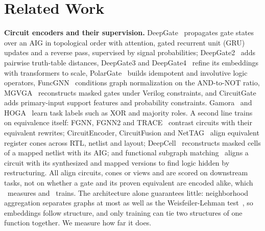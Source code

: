 \section{Related Work}\label{sec:related}
\noindent\textbf{Circuit encoders and their supervision.} DeepGate~\cite{DBLP:conf/dac/0019KSWY022} propagates gate states over an
AIG in topological order with attention, gated recurrent unit (GRU)~\cite{DBLP:conf/emnlp/ChoMGBBSB14} updates and a reverse pass, supervised by signal
probabilities; DeepGate2~\cite{DBLP:conf/iccad/ShiPKLLHZYCX23} adds pairwise truth-table distances, DeepGate3 and DeepGate4~\cite{DBLP:conf/iccad/ShiZKZ0024,DBLP:conf/iclr/ZhengHZSDX025}
refine its embeddings with transformers to scale, PolarGate~\cite{DBLP:conf/iccad/0006ZZLY024} builds idempotent and involutive logic
operators, FuncGNN~\cite{DBLP:journals/trets/ZhaoGZWLJ26} conditions graph normalization on the AND-to-NOT ratio, MGVGA~\cite{DBLP:conf/iclr/WuZ0025} reconstructs masked gates under Verilog constraints, and CircuitGate~\cite{DBLP:journals/corr/abs-2610-09549} adds
primary-input support features and probability constraints. Gamora~\cite{DBLP:conf/dac/WuLHDYX23} and
HOGA~\cite{DBLP:conf/dac/DengYYSCJZ24} learn task labels such as XOR and majority roles. A second line trains on equivalence itself:
FGNN, FGNN2 and TRACE~\cite{DBLP:conf/dac/WangBHZXHYH22,DBLP:journals/tcad/WangBHZXHHY25,DBLP:conf/dac/ZhengZZX26} contrast circuits with their equivalent rewrites;
CircuitEncoder, CircuitFusion and NetTAG~\cite{DBLP:conf/aspdac/FangLZX25,DBLP:conf/iclr/FangLWX25,DBLP:conf/dac/FangLLLZX25} align equivalent register
cones across RTL, netlist and layout; DeepCell~\cite{DBLP:conf/iccad/ShiMZZPJYYCX25} reconstructs masked cells of a mapped netlist with
its AIG; and functional subgraph matching~\cite{DBLP:conf/nips/ZhengLSX25} aligns a circuit with its synthesized and mapped
versions to find logic hidden by restructuring. All align circuits, cones or views and are scored on downstream
tasks, not on whether a gate and its proven equivalent are encoded alike, which \audit\ measures and \ours\
trains. The architecture alone guarantees
little: neighborhood aggregation separates graphs at most as well as the Weisfeiler-Lehman test~\cite{DBLP:conf/iclr/XuHLJ19}, so
embeddings follow structure, and only training can tie two structures of one function together. We measure how
far it does.

